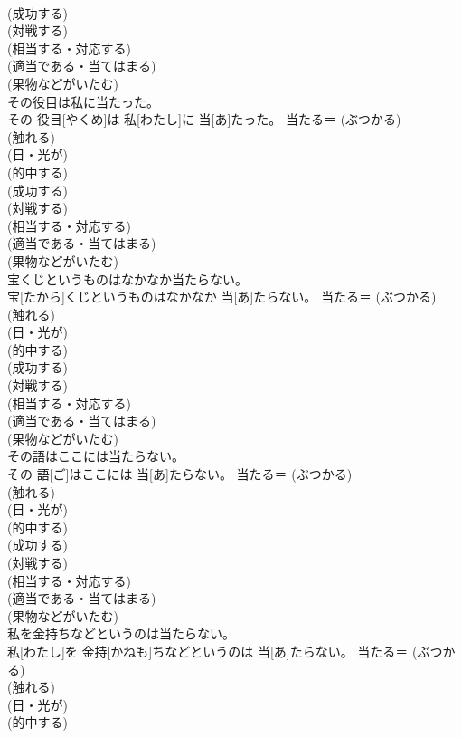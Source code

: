 \documentclass[8pt]{extreport}
\begin{document}
\begin{CJK}{UTF8}{min}
{\\	(成功する) 
\\	(対戦する) 
\\	(相当する・対応する) 
\\	(適当である・当てはまる) 
\\	(果物などがいたむ)
\\	その役目は私に当たった。	
\\	その 役目[やくめ]は 私[わたし]に 当[あ]たった。	当たる＝ (ぶつかる) 
\\	(触れる) 
\\	(日・光が) 
\\	(的中する) 
\\	(成功する) 
\\	(対戦する) 
\\	(相当する・対応する) 
\\	(適当である・当てはまる) 
\\	(果物などがいたむ)
\\	宝くじというものはなかなか当たらない。	
\\	宝[たから]くじというものはなかなか 当[あ]たらない。	当たる＝ (ぶつかる) 
\\	(触れる) 
\\	(日・光が) 
\\	(的中する) 
\\	(成功する) 
\\	(対戦する) 
\\	(相当する・対応する) 
\\	(適当である・当てはまる) 
\\	(果物などがいたむ)
\\	その語はここには当たらない。	
\\	その 語[ご]はここには 当[あ]たらない。	当たる＝ (ぶつかる) 
\\	(触れる) 
\\	(日・光が) 
\\	(的中する) 
\\	(成功する) 
\\	(対戦する) 
\\	(相当する・対応する) 
\\	(適当である・当てはまる) 
\\	(果物などがいたむ)
\\	私を金持ちなどというのは当たらない。	
\\	私[わたし]を 金持[かねも]ちなどというのは 当[あ]たらない。	当たる＝ (ぶつかる) 
\\	(触れる) 
\\	(日・光が) 
\\	(的中する) 
}
\end{CJK}
\end{document}
